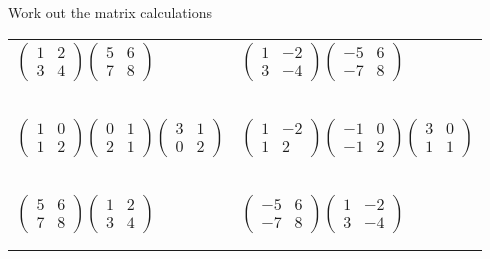 \documentclass[fontsize=20pt]{scrartcl}
\begin{document}
\newpage
Work out the matrix calculations
\newline
\newline
\begin{tabular}{p{13cm}p{13cm}}
$\begin{pmatrix}1&2\\3&4 \end{pmatrix} \begin{pmatrix}5&6\\7&8 \end{pmatrix}$
&$\begin{pmatrix}1&-2\\3&-4 \end{pmatrix} \begin{pmatrix}-5&6\\-7&8 \end{pmatrix}$
\\\\\\
\\\\\\

$\begin{pmatrix}1&0\\1&2 \end{pmatrix} \begin{pmatrix}0&1\\2&1 \end{pmatrix} \begin{pmatrix}3&1\\0&2\end{pmatrix}$
&$\begin{pmatrix}1&-2\\1&2 \end{pmatrix} \begin{pmatrix}-1&0\\-1&2 \end{pmatrix} \begin{pmatrix}3&0\\1&1\end{pmatrix}$
\\\\\\
\\\\\\

$\begin{pmatrix}5&6\\7&8 \end{pmatrix} \begin{pmatrix}1&2\\3&4 \end{pmatrix}$
&$\begin{pmatrix}-5&6\\-7&8 \end{pmatrix} \begin{pmatrix}1&-2\\3&-4 \end{pmatrix}$
\\\\\\
\end{tabular}
\end{document}
